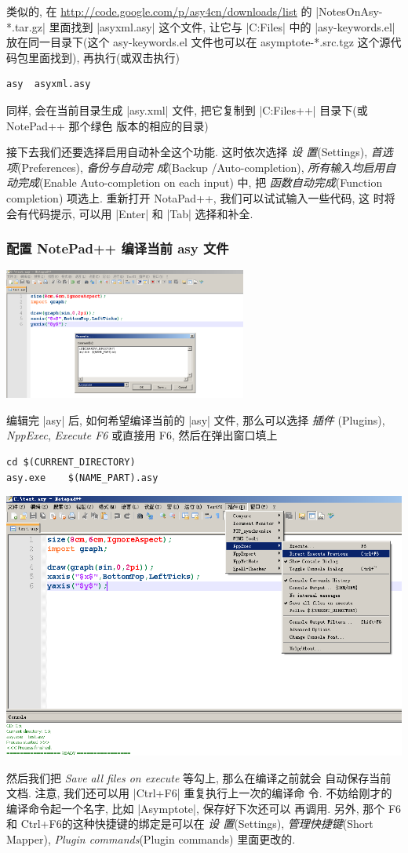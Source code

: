 \documentclass[nofonts,CJKnormalspaces]{ctexbook}
\begin{document}
类似的, 在 \url{http://code.google.com/p/asy4cn/downloads/list}
的 |NotesOnAsy-*.tar.gz| 里面找到 |asyxml.asy| 这个文件, 让它与
|C:\Program Files\Asymptote| 中的 |asy-keywords.el|
放在同一目录下(这个 asy-keywords.el 文件也可以在 asymptote-*.src.tgz
这个源代码包里面找到), 再执行(或双击执行)
\begin{verbatim}
asy  asyxml.asy
\end{verbatim}
同样, 会在当前目录生成 |asy.xml| 文件, 把它复制到
|C:\Program Files\Notepad++\plugins\APIs| 目录下(或 NotePad++ 那个绿色
版本的相应的目录)

接下去我们还要选择启用自动补全这个功能. 这时依次选择  \emph{设
  置}(Settings), \emph{首选项}(Preferences), \emph{备份与自动完
  成}(Backup /Auto-completion), \emph{所有输入均启用自动完成}(Enable
Auto-completion on each input) 中, 把 \emph{函数自动完成}(Function
completion) 项选上. 重新打开 NotaPad++, 我们可以试试输入一些代码, 这
时将会有代码提示, 可以用 |Enter| 和 |Tab| 选择和补全.

\subsubsection{配置 NotePad++ 编译当前 asy 文件}
\begin{center}
  \includegraphics[width=0.6\textwidth]{NotePad++x.png}
\end{center}
编辑完 |asy| 后, 如何希望编译当前的 |asy| 文件, 那么可以选择
\emph{插件 }(Plugins), \emph{NppExec}, \emph{Execute F6} 或直接用 F6,
然后在弹出窗口填上
\begin{verbatim}
cd $(CURRENT_DIRECTORY)
asy.exe    $(NAME_PART).asy
\end{verbatim}
\begin{center}
  \includegraphics[width=0.6\linewidth]{NotePad++y.png}
\end{center}
然后我们把 \emph{Save all files on execute} 等勾上, 那么在编译之前就会
自动保存当前文档. 注意, 我们还可以用 |Ctrl+F6| 重复执行上一次的编译命
令. 不妨给刚才的编译命令起一个名字, 比如 |Asymptote|, 保存好下次还可以
再调用. 另外, 那个 F6 和 Ctrl+F6的这种快捷键的绑定是可以在 \emph{设
  置}(Settings), \emph{管理快捷键}(Short Mapper), \emph{Plugin
  commands}(Plugin commands) 里面更改的.
\end{document}
